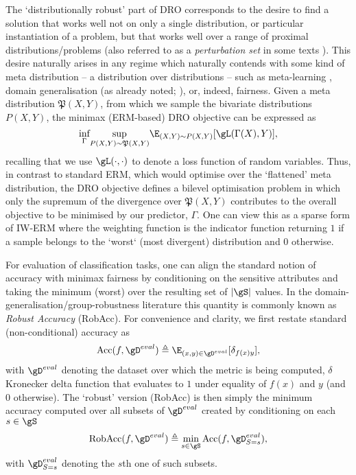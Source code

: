 The `distributionally robust' part of DRO corresponds to the desire to find a solution that works
well not on only a single distribution, or particular instantiation of a problem, but that works
well over a range of proximal distributions/problems (also referred to as a \emph{perturbation
set} in some texts \citep{ben2009robust}). 
%
This desire naturally arises in any regime which naturally contends with some kind of meta
distribution -- a distribution over distributions -- such as meta-learning \citep{collins2020task},
domain generalisation (as already noted; \cite{sagawa2019distributionally}), or, indeed, fairness.
%
Given a meta distribution \(\mathfrak{P}(X, Y)\), from which we sample the bivariate distributions \(
P(X, Y) \), the minimax (ERM-based) DRO objective can be expressed as 
%
\begin{equation}
    \underset{\Gamma}{\text{inf}} 
    \underset{P(X, Y) \sim \mathfrak{P}(X, Y)}{\text{sup}}
    \E_{(X, Y) \sim P(X, Y)}[\gL(\Gamma(X), Y) ],
 \end{equation}
%
recalling that we use \(\gL(\cdot, \cdot)\) to denote a loss function of random variables.
%
Thus, in contrast to standard ERM, which would optimise over the `flattened' meta distribution, the
DRO objective defines a bilevel optimisation problem in which only the supremum of the divergence
over \( \mathfrak{P}(X, Y) \) contributes to the overall objective to be minimised by our
predictor, \(\Gamma\).
%
One can view this as a sparse form of IW-ERM where the weighting function is the indicator function
returning \(1\) if a sample belongs to the `worst` (most divergent) distribution and \(0\)
otherwise.

%
For evaluation of classification tasks, one can align the standard notion of accuracy with minimax
fairness by conditioning on the sensitive attributes and taking the minimum (worst) over the
resulting set of \(|\gS|\) values. 
%
In the domain-generalisation/group-robustness literature this quantity is commonly known as
\emph{Robust Accuracy} (RobAcc).
%
For convenience and clarity, we first restate standard (non-conditional) accuracy as 
%
\begin{equation}
    \text{Acc}(f, \gD^{eval}) \triangleq 
    \E_{ (x, y) \in \gD^{eval}}[ \delta_{f(x)y} ],
 \end{equation}
%
with \( \gD^{eval} \) denoting the dataset over which the metric is being computed, \( \delta
\) Kronecker delta function that evaluates to \(1\) under equality of \(f(x)\) and \(y\) (and \(0\)
otherwise).
%
The `robust' version (RobAcc) is then simply the minimum accuracy computed over all subsets of \(
\gD^{eval} \) created by conditioning on each \(s \in \gS \)
%
\begin{equation}
    \text{RobAcc}(f, \gD^{eval}) \triangleq 
    \underset{s \in \gS}{\text{min}} \, \text{Acc}(f, \gD^{eval}_{S=s}),
 \end{equation}
%
 with \( \gD^{eval}_{S=s} \) denoting the \(s\)th one of such subsets.

